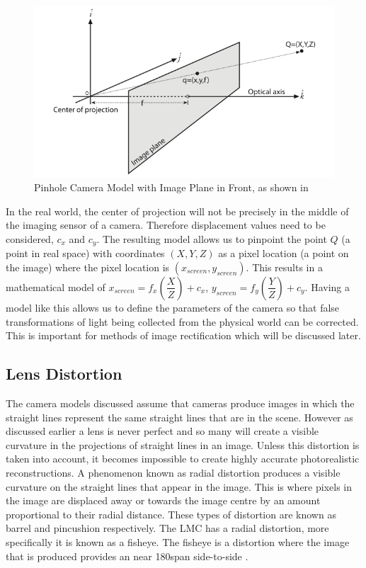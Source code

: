 \documentclass[11pt,oneside]{report}
\begin{document}
				\begin{figure}
				\centering
					\includegraphics[width=\textwidth]{pinhole2}
					\caption{Pinhole Camera Model with Image Plane in Front, as shown in \protect{} {\label{fig:pinhole2}}}

				\end{figure}
				In the real world, the center of projection will not be precisely in the middle of the imaging sensor of a camera.
				Therefore displacement values need to be considered, $c_{x}$ and $c_{y}$.
				The resulting model allows us to pinpoint the point $Q$ (a point in real space) with coordinates $(X,Y,Z)$ as a pixel location (a point on the image) where the pixel location is $(x_{screen}, y_{screen})$.
				This results in a mathematical model of $x_{screen}=f_{x}\left(\dfrac{X}{Z}\right)+c_{x}$, $y_{screen}=f_{y}\left(\dfrac{Y}{Z}\right)+c_{y}$.
				Having a model like this allows us to define the parameters of the camera so that false transformations of light being collected from the physical world can be corrected.
				This is important for methods of image rectification which will be discussed later.
				\subsection{Lens Distortion}
					The camera models discussed assume that cameras produce images in which the straight lines represent the same straight lines that are in the scene.
					However as discussed earlier a lens is never perfect and so many will create a visible curvature in the projections of straight lines in an image.
					Unless this distortion is taken into account, it becomes impossible to create highly accurate photorealistic reconstructions.
					A phenomenon known as radial distortion produces a visible curvature on the straight lines that appear in the image.
					This is where pixels in the image are displaced away or towards the image centre by an amount proportional to their radial distance.
					These types of distortion are known as barrel and pincushion respectively.
					The LMC has a radial distortion, more specifically it is known as a fisheye.
					The fisheye is a distortion where the image that is produced provides an near 180\degree span side-to-side \cite{book:sam}.
					
\end{document}
